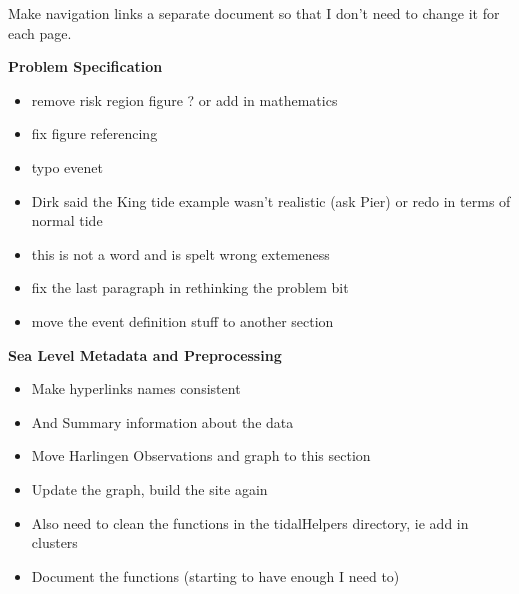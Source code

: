 \documentclass[10pt,a4paper]{article}
\begin{document}
Make navigation links a separate document so that I don't need to change it for each page.

\textbf{Problem Specification}
\begin{itemize}
	\item remove risk region figure ? or add in mathematics 
	\item fix figure referencing
	\item typo evenet
	\item Dirk said the King tide example wasn't realistic (ask Pier) or redo in terms of normal tide
	\item this is not a word and is spelt wrong extemeness
	\item fix the last paragraph in rethinking the problem bit
	\item move the event definition stuff to another section
\end{itemize}

\textbf{Sea Level Metadata and Preprocessing}
\begin{itemize}
	\item Make hyperlinks names consistent 
	\item And Summary information about the data
	\item Move Harlingen Observations and graph to this section
	\item Update the graph, build the site again 
	\item Also need to clean the functions in the tidalHelpers directory, ie add in clusters
	\item Document the functions (starting to have enough I need to)
\end{itemize}
\end{document}
